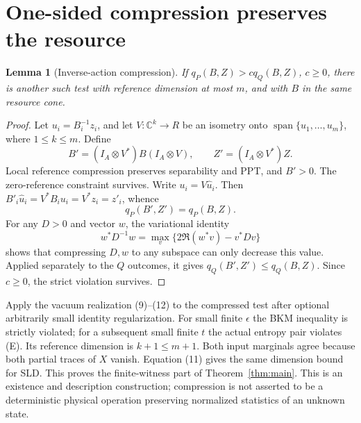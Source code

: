 \documentclass[11pt]{article}
\newtheorem{lemma}{Lemma}
\newcommand{\C}{\mathbb C}
\begin{document}
\section{One-sided compression preserves the resource}
\begin{lemma}[Inverse-action compression]\label{lem:compression}
If $q_P(B,Z)>c q_Q(B,Z)$, $c\geq0$, there is another such test with
reference dimension at most $m$, and with $B$ in the same resource cone.
\end{lemma}
\begin{proof}
Let $u_i=B_i^{-1}z_i$, and let $V:\C^k\to R$ be an isometry onto
$\operatorname{span}\{u_1,\ldots,u_m\}$, where $1\leq k\leq m$.
Define
\[
 B'=(I_A\otimes V^*)B(I_A\otimes V),\qquad
 Z'=(I_A\otimes V^*)Z.                                      \tag{13}
\]
Local reference compression preserves separability and PPT, and $B'>0$.
The zero-reference constraint survives. Write $u_i=V\widehat u_i$. Then
$B'_i\widehat u_i=V^*B_i u_i=V^*z_i=z'_i$, whence
\[
                    q_P(B',Z')=q_P(B,Z).                     \tag{14}
\]
For any $D>0$ and vector $w$, the variational identity
\[
 w^*D^{-1}w=\max_v\{2\Re(w^*v)-v^*Dv\}
\]
shows that compressing $D,w$ to any subspace can only decrease this value.
Applied separately to the $Q$ outcomes, it gives
$q_Q(B',Z')\leq q_Q(B,Z)$. Since $c\geq0$, the strict violation survives.
\end{proof}

Apply the vacuum realization (9)--(12) to the compressed test after optional
arbitrarily small identity regularization. For small finite $\epsilon$ the
BKM inequality is strictly violated; for a subsequent small finite $t$ the
actual entropy pair violates (E). Its reference dimension is $k+1\leq m+1$.
Both input marginals agree because both partial traces of $X$ vanish.
Equation (11) gives the same dimension bound for SLD. This proves the
finite-witness part of Theorem~\ref{thm:main}. This is an existence and
description construction; compression is not asserted to be a deterministic
physical operation preserving normalized statistics of an unknown state.
\end{document}
